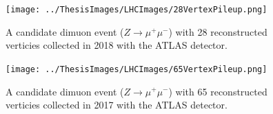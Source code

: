 \begin{figure}[ht!]
	\centering
	\texttt{[image: ../ThesisImages/LHCImages/28VertexPileup.png]}
	\caption[A candidate dimuon event ($Z\rightarrow \mu^+ \mu^-$) with 28 reconstructed verticies collected in 2018 with the ATLAS detector.]{ A candidate dimuon event ($Z\rightarrow \mu^+ \mu^-$) with 28 reconstructed verticies collected in 2018 with the ATLAS detector\cite{ATLASLumi}.
	}
	\label{fig:HighPileup}
\end{figure}

\begin{figure}[ht!]
	\centering
	\texttt{[image: ../ThesisImages/LHCImages/65VertexPileup.png]}
	\caption[A candidate dimuon event ($Z\rightarrow \mu^+ \mu^-$) with 65 reconstructed verticies collected in 2017 with the ATLAS detector.]{ A candidate dimuon event ($Z\rightarrow \mu^+ \mu^-$) with 65 reconstructed verticies collected in 2017 with the ATLAS detector\cite{ATLASLumi}.
	}
	\label{fig:HighPileup2}
\end{figure}

